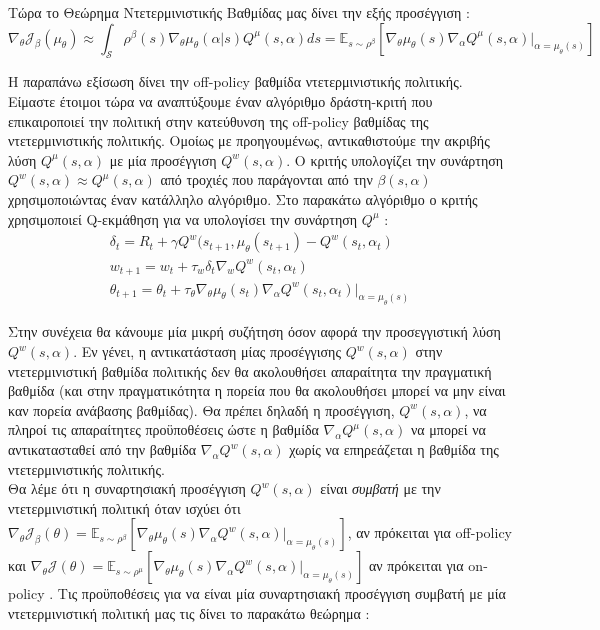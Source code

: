 \documentclass[11pt]{article} %
\numberwithin{equation}{subsection}
\begin{document}
Τώρα το Θεώρημα Ντετερμινιστικής Βαθμίδας μας δίνει την εξής προσέγγιση \cite{dpga}:
\begin{equation}
\nabla_{\theta} \mathcal{J}_{\beta}(\mu_{\theta}) \approx \int_{\mathcal{S}} \rho^{\beta}(s) \nabla_{\theta} \mu_{\theta}(\alpha | s) Q^{\mu}(s,\alpha) ds = \mathbb{E}_{s \sim \rho^{\beta}}\left[\nabla_{\theta} \mu_{\theta}(s) \nabla_{\alpha} Q^{\mu}(s,\alpha)|_{\alpha = \mu_{\theta}(s)}\right]
\end{equation}

Η παραπάνω εξίσωση δίνει την off-policy βαθμίδα ντετερμινιστικής πολιτικής. Είμαστε έτοιμοι τώρα να αναπτύξουμε έναν αλγόριθμο δράστη-κριτή που επικαιροποιεί την πολιτική στην κατεύθυνση της off-policy βαθμίδας της ντετερμινιστικής πολιτικής. Ομοίως με προηγουμένως, αντικαθιστούμε την ακριβής λύση $Q^{\mu}(s,\alpha)$ με μία προσέγγιση $Q^{w}(s,\alpha)$. Ο κριτής υπολογίζει την συνάρτηση $Q^{w}(s,\alpha) \approx Q^{\mu}(s,\alpha)$ από τροχιές που παράγονται από την $\beta(s,\alpha)$ χρησιμοποιώντας έναν κατάλληλο αλγόριθμο. Στο παρακάτω αλγόριθμο ο κριτής χρησιμοποιεί Q-εκμάθηση για να υπολογίσει την συνάρτηση $Q^{\mu}$ \cite{sutton}:
\begin{align*}
\delta_{t} = R_{t} + \gamma Q^{w}(s_{t+1},\mu_{\theta}(s_{t+1}) - Q^{w}(s_{t},\alpha_{t})\\
w_{t+1} = w_{t} + \tau_{w} \delta_{t} \nabla_{w} Q^{w}(s_{t},\alpha_{t})\\
\theta_{t+1} = \theta_{t} + \tau_{\theta} \nabla_{\theta} \mu_{\theta}(s_{t}) \nabla_{\alpha} Q^{w}(s_{t},\alpha_{t})|_{\alpha = \mu_{\theta}(s)}
\end{align*}

Στην συνέχεια θα κάνουμε μία μικρή συζήτηση όσον αφορά την προσεγγιστική λύση $Q^{w}(s,\alpha)$. Εν γένει, η αντικατάσταση μίας προσέγγισης $Q^{w}(s,\alpha)$ στην ντετερμινιστική βαθμίδα πολιτικής δεν θα ακολουθήσει απαραίτητα την πραγματική βαθμίδα (και στην πραγματικότητα η πορεία που θα ακολουθήσει μπορεί να μην είναι καν πορεία ανάβασης βαθμίδας). Θα πρέπει δηλαδή η προσέγγιση, $Q^{w}(s,\alpha)$, να πληροί τις απαραίτητες προϋποθέσεις ώστε η βαθμίδα $\nabla_{\alpha}Q^{\mu}(s,\alpha)$ να μπορεί να αντικατασταθεί από την βαθμίδα $\nabla_{\alpha}Q^{w}(s,\alpha)$ χωρίς να επηρεάζεται η βαθμίδα της ντετερμινιστικής πολιτικής.\\ 

Θα λέμε ότι η συναρτησιακή προσέγγιση $Q^{w}(s,\alpha)$ είναι \textit{συμβατή} με την ντετερμινιστική πολιτική \cite{dpga} όταν ισχύει ότι $\nabla_{\theta} \mathcal{J}_{\beta}(\theta) = \mathbb{E}_{s \sim \rho^{\beta}} \left[ \nabla_{\theta} \mu_{\theta}(s) \nabla_{\alpha} Q^{w}(s,\alpha)|_{\alpha = \mu_{\theta}(s)}\right]$, αν πρόκειται για off-policy και $\nabla_{\theta} \mathcal{J}(\theta) = \mathbb{E}_{s \sim \rho^{\mu}} \left[ \nabla_{\theta} \mu_{\theta}(s) \nabla_{\alpha} Q^{w}(s,\alpha)|_{\alpha = \mu_{\theta}(s)}\right]$ αν πρόκειται για on-policy . Τις προϋποθέσεις για να είναι μία συναρτησιακή προσέγγιση συμβατή με μία ντετερμινιστική πολιτική μας τις δίνει το παρακάτω θεώρημα \cite{dpga}:\\
\end{document}
